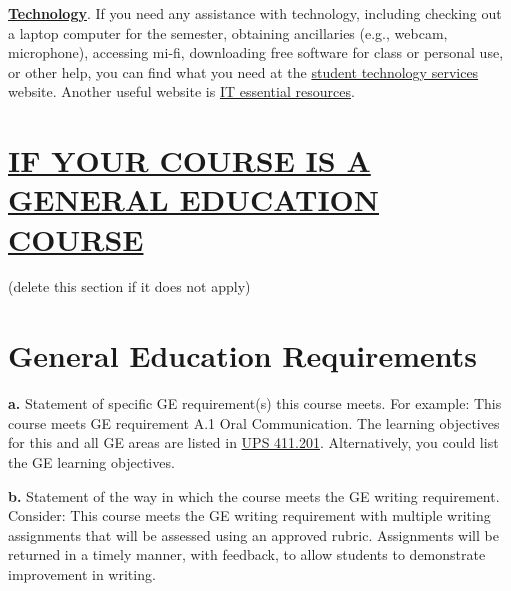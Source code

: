 \documentclass[12pt]{article} %
\begin{document}
\vspace{0.5em}

\noindent \textbf{\underline{Technology}}. {\color{suggestionred}If you need any assistance with technology, including checking out a laptop computer for the semester, obtaining ancillaries (e.g., webcam, microphone), accessing mi-fi, downloading free software for class or personal use, or other help, you can find what you need at the \href{https://www.fullerton.edu/IT/students/}{student technology services} website. Another useful website is \href{http://www.fullerton.edu/it/essential-resources/}{IT essential resources}.}

\section*{\underline{IF YOUR COURSE IS A GENERAL EDUCATION COURSE}} {\color{annotationblue}(delete this section if it does not apply)}

\section*{General Education Requirements}


\vspace{0.5em}

\noindent \textbf{a.} {\color{annotationblue}Statement of specific GE requirement(s) this course meets.} {\color{suggestionred}For example: This course meets GE requirement A.1 Oral Communication. The learning objectives for this and all GE areas are listed in \href{https://www.fullerton.edu/senate/publications_policies_resolutions/ups/UPS\%20400/UPS\%20411.201.pdf}{UPS 411.201}. Alternatively, you could list the GE learning objectives.}

\vspace{0.5em}

\noindent \textbf{b.} {\color{annotationblue}Statement of the way in which the course meets the GE writing requirement.} {\color{suggestionred}Consider: This course meets the GE writing requirement with multiple writing assignments that will be assessed using an approved rubric. Assignments will be returned in a timely manner, with feedback, to allow students to demonstrate improvement in writing.}
\end{document}
